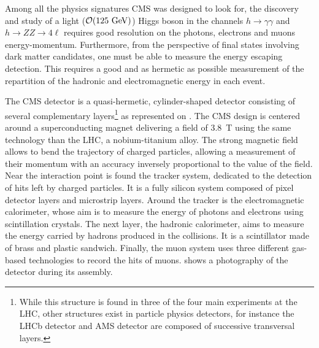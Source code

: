     Among all the physics signatures CMS was designed to look for, the discovery and study of a
    light ($\mathcal{O}(125 ~\text{GeV})$) Higgs boson in the channels $h\rightarrow\gamma\gamma$
    and $h\rightarrow ZZ \rightarrow 4\ell$ requires good resolution on the photons,
    electrons and muons energy-momentum. Furthermore, from the perspective of final
    states involving dark matter candidates, one must be able to measure
    the energy escaping detection. This requires a good and as hermetic as
    possible measurement of the repartition of the hadronic and electromagnetic energy
    in each event.


    The CMS detector is a quasi-hermetic, cylinder-shaped detector consisting of
    several complementary layers\footnote{While this structure is found in three of the four
    main experiments at the LHC, other structures exist in particle physics detectors,
    for instance the LHCb detector and AMS detector are composed of successive
    transversal layers.}
    as represented on .
    The CMS design is centered around a superconducting magnet delivering a field of
    3.8~T using the same technology than the LHC, a nobium-titanium alloy. The strong
    magnetic field allows to bend the trajectory of charged particles, allowing a
    measurement of their momentum with an accuracy inversely proportional to the value
    of the field.
    Near the interaction point is found the tracker system, dedicated to
    the detection of hits left by charged particles. It is a fully silicon system composed of pixel detector
    layers and microstrip layers. Around the tracker is the electromagnetic
    calorimeter, whose aim is to measure the energy of photons and electrons using
    scintillation crystals. The next layer, the hadronic calorimeter, aims to measure
    the energy carried by hadrons produced in the collisions. It is a scintillator made
    of brass and plastic sandwich. Finally, the muon system uses three different gas-based
    technologies to record the hits of muons. 
    shows a photography of the detector during its assembly.



